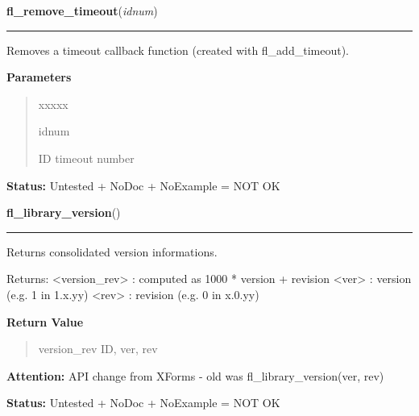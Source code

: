 \hspace{.8\funcindent}\begin{boxedminipage}{\funcwidth}

    \raggedright \textbf{fl\_remove\_timeout}(\textit{idnum})

    \vspace{-1.5ex}

    \rule{\textwidth}{0.5\fboxrule}
\setlength{\parskip}{2ex}
    Removes a timeout callback function (created with fl\_add\_timeout).

\setlength{\parskip}{1ex}
      \textbf{Parameters}
      \vspace{-1ex}

      \begin{quote}
        \begin{Ventry}{xxxxx}

          \item[idnum]

          ID timeout number

        \end{Ventry}

      \end{quote}

\textbf{Status:} Untested + NoDoc + NoExample = NOT OK



    \end{boxedminipage}

    \label{xformslib:library:fl_library_version}

    \vspace{0.5ex}

\hspace{.8\funcindent}\begin{boxedminipage}{\funcwidth}

    \raggedright \textbf{fl\_library\_version}()

    \vspace{-1.5ex}

    \rule{\textwidth}{0.5\fboxrule}
\setlength{\parskip}{2ex}
    Returns consolidated version informations.

    Returns: {\textless}version\_rev{\textgreater} : computed as 1000 * 
    version + revision {\textless}ver{\textgreater} : version (e.g. 1 in 
    1.x.yy) {\textless}rev{\textgreater} : revision (e.g. 0 in x.0.yy)

\setlength{\parskip}{1ex}
      \textbf{Return Value}
    \vspace{-1ex}

      \begin{quote}
      version\_rev ID, ver, rev

      \end{quote}

\textbf{Attention:} API change from XForms - old was fl\_library\_version(ver, rev)



\textbf{Status:} Untested + NoDoc + NoExample = NOT OK



    \end{boxedminipage}

